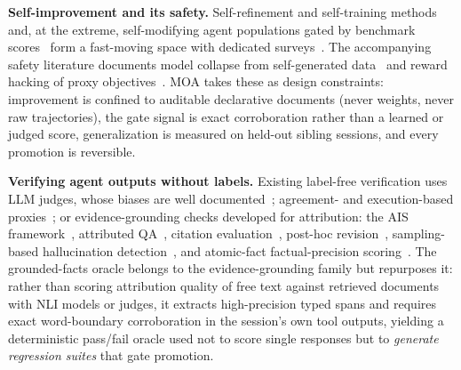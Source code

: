 \documentclass{article}
\newcommand{\moa}{MOA}
\begin{document}
\textbf{Self-improvement and its safety.} Self-refinement and self-training methods~\citep{madaan2023selfrefine, shinn2023reflexion, zelikman2022star} and, at the extreme, self-modifying agent populations gated by benchmark scores~\citep{zhang2025dgm} form a fast-moving space with dedicated surveys~\citep{tao2024selfevolution, gao2025selfevolving}. The accompanying safety literature documents model collapse from self-generated data~\citep{shumailov2023curse} and reward hacking of proxy objectives~\citep{pan2022rewardmisspec}. \moa{} takes these as design constraints: improvement is confined to auditable declarative documents (never weights, never raw trajectories), the gate signal is exact corroboration rather than a learned or judged score, generalization is measured on held-out sibling sessions, and every promotion is reversible.

\textbf{Verifying agent outputs without labels.} Existing label-free verification uses LLM judges, whose biases are well documented~\citep{zheng2023llmjudge, wang2023fairevaluators}; agreement- and execution-based proxies~\citep{wang2022selfconsistency, chen2022codet}; or evidence-grounding checks developed for attribution: the AIS framework~\citep{rashkin2023ais}, attributed QA~\citep{bohnet2022attributedqa}, citation evaluation~\citep{gao2023alce}, post-hoc revision~\citep{gao2023rarr}, sampling-based hallucination detection~\citep{manakul2023selfcheckgpt}, and atomic-fact factual-precision scoring~\citep{min2023factscore}. The grounded-facts oracle belongs to the evidence-grounding family but repurposes it: rather than scoring attribution quality of free text against retrieved documents with NLI models or judges, it extracts high-precision typed spans and requires exact word-boundary corroboration in the session's own tool outputs, yielding a deterministic pass/fail oracle used not to score single responses but to \emph{generate regression suites} that gate promotion.
\end{document}
